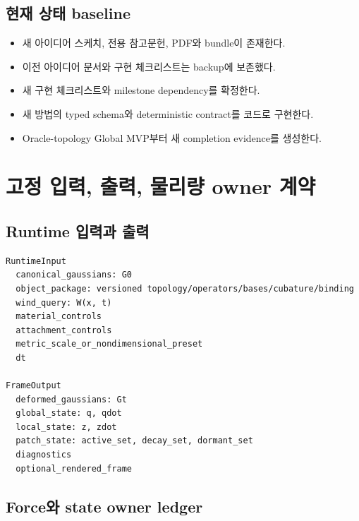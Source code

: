 \documentclass[10pt,a4paper]{article}
\newcommand{\todo}{\textcolor{TodoGray}{\(\square\)}}
\newcommand{\done}{\textcolor{DoneGreen}{\(\boxtimes\)}}
\begin{document}
\subsection{현재 상태 baseline}

\begin{itemize}
  \item[\done] 새 아이디어 스케치, 전용 참고문헌, PDF와 bundle이 존재한다.
  \item[\done] 이전 아이디어 문서와 구현 체크리스트는 backup에 보존했다.
  \item[\done] 새 구현 체크리스트와 milestone dependency를 확정한다.
  \item[\todo] 새 방법의 typed schema와 deterministic contract를 코드로 구현한다.
  \item[\todo] Oracle-topology Global MVP부터 새 completion evidence를 생성한다.
\end{itemize}

\section{고정 입력, 출력, 물리량 owner 계약}

\subsection{Runtime 입력과 출력}

\begin{lstlisting}
RuntimeInput
  canonical_gaussians: G0
  object_package: versioned topology/operators/bases/cubature/binding
  wind_query: W(x, t)
  material_controls
  attachment_controls
  metric_scale_or_nondimensional_preset
  dt

FrameOutput
  deformed_gaussians: Gt
  global_state: q, qdot
  local_state: z, zdot
  patch_state: active_set, decay_set, dormant_set
  diagnostics
  optional_rendered_frame
\end{lstlisting}

\subsection{Force와 state owner ledger}
\end{document}
